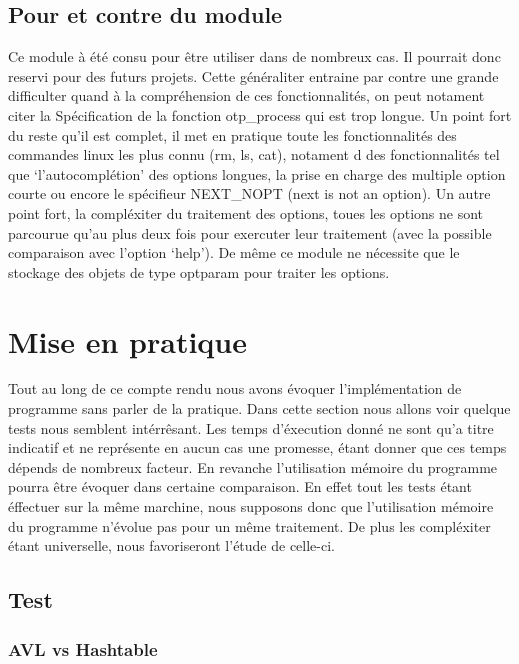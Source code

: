 \documentclass[12pt]{article}
\begin{document}
    \subsection{Pour et contre du module}

    Ce module à été consu pour être utiliser dans de nombreux cas. Il pourrait 
    donc reservi pour des futurs projets. Cette généraliter entraine par contre 
    une grande difficulter quand à la compréhension de ces fonctionnalités, on 
    peut notament citer la Spécification de la fonction otp\_process qui est 
    trop longue.
    Un point fort du reste qu'il est complet, il met en pratique toute les 
    fonctionnalités des commandes linux les plus connu (rm, ls, cat), notament d
    des fonctionnalités tel que `l'autocomplétion' des options longues, la prise
    en charge des multiple option courte ou encore le spécifieur NEXT\_NOPT 
    (next is not an option). Un autre point fort, la compléxiter du traitement 
    des options, toues les options ne sont parcourue qu'au plus deux fois pour 
    exercuter leur traitement (avec la possible comparaison avec l'option 
    `help'). De même ce module ne nécessite que le stockage des objets de type 
    optparam pour traiter les options.

    \section{Mise en pratique}\label{test}

    Tout au long de ce compte rendu nous avons évoquer l'implémentation de 
    programme sans parler de la pratique. Dans cette section nous allons voir
    quelque tests nous semblent intérrêsant.
    Les temps d'éxecution donné ne sont qu'a titre indicatif et ne représente en 
    aucun cas une promesse, étant donner que ces temps dépends de nombreux 
    facteur. En revanche l'utilisation mémoire du programme pourra être évoquer 
    dans certaine comparaison. En effet tout les tests étant éffectuer sur la 
    même marchine, nous supposons donc que l'utilisation mémoire du programme 
    n'évolue pas pour un même traitement. De plus les compléxiter étant 
    universelle, nous favoriseront l'étude de celle-ci.

    \subsection{Test}

    \subsubsection{AVL vs Hashtable}\label{avl-has}
\end{document}
